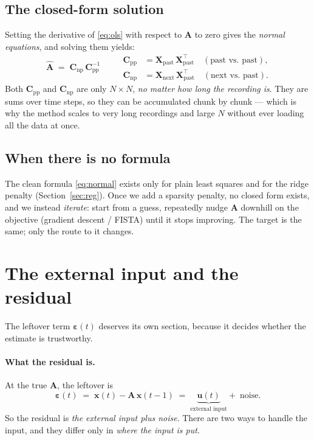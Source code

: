 \documentclass[11pt,a4paper]{article}
\newcommand{\xx}{\mathbf{x}}
\newcommand{\uu}{\mathbf{u}}
\newcommand{\Amat}{\mathbf{A}}
\newcommand{\eps}{\boldsymbol{\varepsilon}}
\newcommand{\Xp}{\mathbf{X}_{\text{past}}}
\newcommand{\Xn}{\mathbf{X}_{\text{next}}}
\begin{document}
\subsection{The closed-form solution}
Setting the derivative of \eqref{eq:ols} with respect to $\Amat$ to zero gives the
\emph{normal equations}, and solving them yields:
\begin{equation}
\boxed{\;\widehat{\Amat} \;=\; \mathbf{C}_{\text{np}}\,\mathbf{C}_{\text{pp}}^{-1}\;}
\qquad
\begin{aligned}
\mathbf{C}_{\text{pp}} &= \Xp\,\Xp^{\!\top} \quad(\text{past vs.\ past}),\\
\mathbf{C}_{\text{np}} &= \Xn\,\Xp^{\!\top} \quad(\text{next vs.\ past}).
\end{aligned}
\label{eq:normal}
\end{equation}
Both $\mathbf{C}_{\text{pp}}$ and $\mathbf{C}_{\text{np}}$ are only $N\times N$,
\emph{no matter how long the recording is}. They are sums over time steps, so
they can be accumulated chunk by chunk --- which is why the method scales to very
long recordings and large $N$ without ever loading all the data at once.

\subsection{When there is no formula}
The clean formula \eqref{eq:normal} exists only for plain least squares and for
the ridge penalty (Section~\ref{sec:reg}). Once we add a sparsity penalty, no
closed form exists, and we instead \emph{iterate}: start from a guess, repeatedly
nudge $\Amat$ downhill on the objective (gradient descent / FISTA) until it stops
improving. The target is the same; only the route to it changes.

\section{The external input and the residual}
\label{sec:residual}

The leftover term $\eps(t)$ deserves its own section, because it decides whether
the estimate is trustworthy.

\paragraph{What the residual is.}
At the true $\Amat$, the leftover is
\begin{equation}
\eps(t) \;=\; \xx(t) - \Amat\,\xx(t-1) \;=\; \underbrace{\uu(t)}_{\text{external input}} + \;\text{noise} .
\end{equation}
So the residual is \emph{the external input plus noise}. There are two ways to
handle the input, and they differ only in \emph{where the input is put}.
\end{document}
